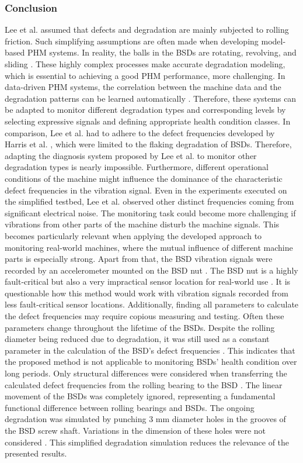 \subsubsection{Conclusion}
Lee et al. \cite{Lee2015} assumed that defects and degradation are mainly subjected to rolling friction. Such simplifying assumptions are often made when developing model-based PHM systems. In reality, the balls in the BSDs are rotating, revolving, and sliding \cite{Lee2015}. These highly complex processes make accurate degradation modeling, which is essential to achieving a good PHM performance, more challenging. In data-driven PHM systems, the correlation between the machine data and the degradation patterns can be learned automatically \cite{ZHAO2019213}. Therefore, these systems can be adapted to monitor different degradation types and corresponding levels by selecting expressive signals and defining appropriate health condition classes. In comparison, Lee et al. \cite{Lee2015} had to adhere to the defect frequencies developed by Harris et al. \cite{Harris1996}, which were limited to the flaking degradation of BSDs. Therefore, adapting the diagnosis system proposed by Lee et al. \cite{Lee2015} to monitor other degradation types is nearly impossible. Furthermore, different operational conditions of the machine might influence the dominance of the characteristic defect frequencies in the vibration signal.
Even in the experiments executed on the simplified testbed, Lee et al. \cite{Lee2015} observed other distinct frequencies coming from significant electrical noise. The monitoring task could become more challenging if vibrations from other parts of the machine disturb the machine signals. This becomes particularly relevant when applying the developed approach to monitoring real-world machines, where the mutual influence of different machine parts is especially strong. Apart from that, the BSD vibration signals were recorded by an accelerometer mounted on the BSD nut \cite{Lee2015}. The BSD nut is a highly fault-critical but also a very impractical sensor location for real-world use \cite{Pandhare2021}. It is questionable how this method would work with vibration signals recorded from less fault-critical sensor locations. Additionally, finding all parameters to calculate the defect frequencies may require copious measuring and testing. Often these parameters change throughout the lifetime of the BSDs. Despite the rolling diameter being reduced due to degradation, it was still used as a constant parameter in the calculation of the BSD’s defect frequencies \cite{Denkena2021} \cite{Pandhare2021}. This indicates that the proposed method is not applicable to monitoring BSDs' health condition over long periods. Only structural differences were considered when transferring the calculated defect frequencies from the rolling bearing to the BSD \cite{Lee2015}. The linear movement of the BSDs was completely ignored, representing a fundamental functional difference between rolling bearings and BSDs. The ongoing degradation was simulated by punching 3 mm diameter holes in the grooves of the BSD screw shaft. Variations in the dimension of these holes were not considered \cite{Lee2015}. This simplified degradation simulation reduces the relevance of the presented results.

